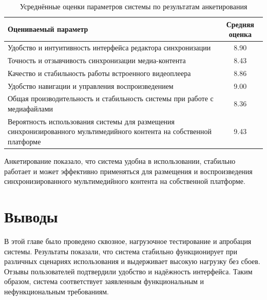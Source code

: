 	\begin{table}[h!]
		\centering
		\renewcommand{\arraystretch}{1.3}
		\begin{tabular}{|p{9cm}|c|}
			\hline
			\textbf{Оцениваемый параметр} & \textbf{Средняя оценка} \\
			\hline
			Удобство и интуитивность интерфейса редактора синхронизации & 8.90 \\
			\hline
			Точность и отзывчивость синхронизации медиа-контента & 8.43 \\
			\hline
			Качество и стабильность работы встроенного видеоплеера & 8.86 \\
			\hline
			Удобство навигации и управления воспроизведением & 9.00 \\
			\hline
			Общая производительность и стабильность системы при работе с медиафайлами & 8.36 \\
			\hline
			Вероятность использования системы для размещения синхронизированного мультимедийного контента на собственной платформе & 9.43 \\
			\hline
		\end{tabular}
		\caption{Усреднённые оценки параметров системы по результатам анкетирования}
		\label{tab:survey_results}
	\end{table}

	Анкетирование показало, что система удобна в использовании, стабильно работает и может эффективно применяться для размещения и воспроизведения синхронизированного мультимедийного контента на собственной платформе.

	\section{Выводы}

	В этой главе было проведено сквозное, нагрузочное тестирование и апробация системы. Результаты показали, что система стабильно функционирует при различных сценариях использования и выдерживает высокую нагрузку без сбоев. Отзывы пользователей подтвердили удобство и надёжность интерфейса. Таким образом, система соответствует заявленным функциональным и нефункциональным требованиям.
